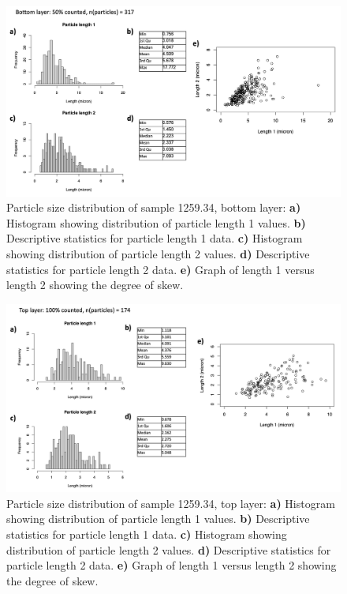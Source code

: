 \begin{figure}[H]
\centering
  \includegraphics[width=0.8\linewidth]{1259.34_partsize_2}
\caption[Particle size distribution, sample 1259.34, bottom layer.]{Particle size distribution of sample 1259.34, bottom layer: \textbf{a)} Histogram showing distribution of particle length 1 values. \textbf{b)} Descriptive statistics for particle length 1 data. \textbf{c)} Histogram showing distribution of particle length 2 values. \textbf{d)} Descriptive statistics for particle length 2 data. \textbf{e)} Graph of length 1 versus length 2 showing the degree of skew.}
\label{fig:1259.34_partsize_2}
\end{figure}

\begin{figure}[H]
\centering
  \includegraphics[width=0.8\linewidth]{1259.34_partsize}
\caption[Particle size distribution, sample 1259.34, top layer.]{Particle size distribution of sample 1259.34, top layer: \textbf{a)} Histogram showing distribution of particle length 1 values. \textbf{b)} Descriptive statistics for particle length 1 data. \textbf{c)} Histogram showing distribution of particle length 2 values. \textbf{d)} Descriptive statistics for particle length 2 data. \textbf{e)} Graph of length 1 versus length 2 showing the degree of skew.}
\label{fig:1259.34_partsize_1}
\end{figure}


